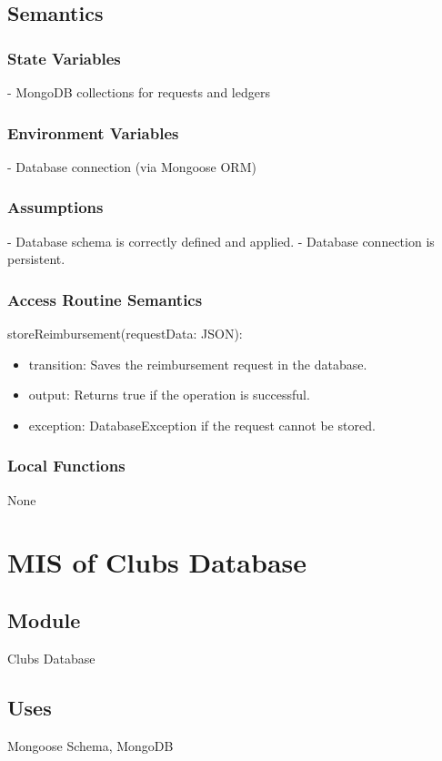 \documentclass[12pt, titlepage]{article}
\begin{document}
\subsection{Semantics}

\subsubsection{State Variables}
- MongoDB collections for requests and ledgers

\subsubsection{Environment Variables}
- Database connection (via Mongoose ORM)

\subsubsection{Assumptions}
- Database schema is correctly defined and applied.
- Database connection is persistent.

\subsubsection{Access Routine Semantics}
\noindent storeReimbursement(requestData: JSON):
\begin{itemize}
\item transition: Saves the reimbursement request in the database.
\item output: Returns true if the operation is successful.
\item exception: DatabaseException if the request cannot be stored.
\end{itemize}

\subsubsection{Local Functions}
None

\section{MIS of Clubs Database} \label{Clubs Database}

\subsection{Module}
Clubs Database

\subsection{Uses}
Mongoose Schema, MongoDB
\end{document}
